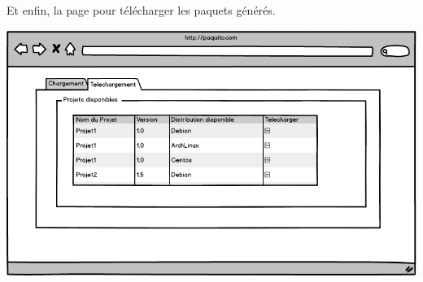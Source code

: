 \documentclass[12pt,a4paper]{article}
\begin{document}
Et enfin, la page pour télécharger les paquets générés.

\includegraphics[scale=0.6]{../img/telechargerProjet.png}
	
\end{document}
